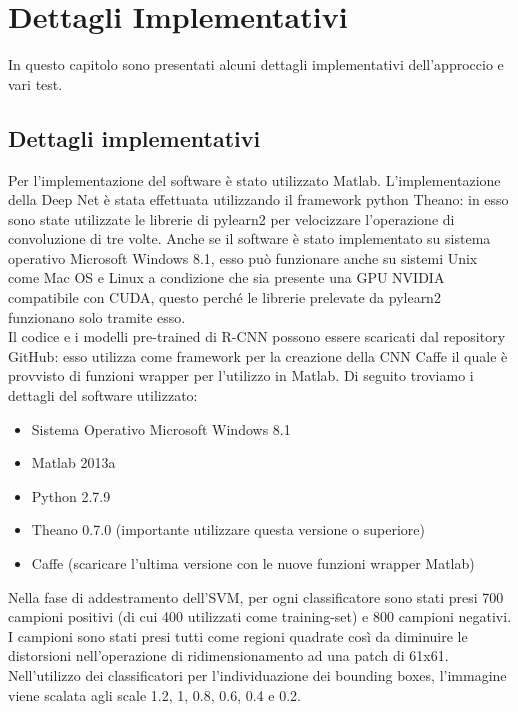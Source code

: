 \chapter{Dettagli Implementativi} \label{cap3}
In questo capitolo sono presentati alcuni dettagli implementativi dell'approccio e vari test.

\section{Dettagli implementativi}
Per l'implementazione del software è stato utilizzato Matlab\cite{matlab}. L'implementazione della Deep Net è stata effettuata utilizzando il framework python Theano\cite{theano}: in esso sono state utilizzate le librerie di pylearn2\cite{pylearn2} per velocizzare l'operazione di convoluzione di tre volte\cite{conv-3x}. Anche se il software è stato implementato su sistema operativo Microsoft Windows 8.1, esso può funzionare anche su sistemi Unix come Mac OS e Linux a condizione che sia presente una GPU NVIDIA compatibile con CUDA\cite{cuda}, questo perché le librerie prelevate da pylearn2 funzionano solo tramite esso.\\
Il codice e i modelli pre-trained di R-CNN possono essere scaricati dal repository GitHub: esso utilizza come framework per la creazione della CNN Caffe\cite{caffe} il quale è provvisto di funzioni wrapper per l'utilizzo in Matlab.
Di seguito troviamo i dettagli del software utilizzato:

\begin{itemize}
\item Sistema Operativo Microsoft Windows 8.1
\item Matlab 2013a
\item Python 2.7.9
\item Theano 0.7.0 (importante utilizzare questa versione o superiore)
\item Caffe (scaricare l'ultima versione con le nuove funzioni wrapper Matlab)
\end{itemize}

Nella fase di addestramento dell'SVM, per ogni classificatore sono stati presi 700 campioni positivi (di cui 400 utilizzati come training-set) e 800 campioni negativi. I campioni sono stati presi tutti come regioni quadrate così da diminuire le distorsioni nell'operazione di ridimensionamento ad una patch di 61x61.\\

Nell'utilizzo dei classificatori per l'individuazione dei bounding boxes, l'immagine viene scalata agli scale 1.2, 1, 0.8, 0.6, 0.4 e 0.2.

